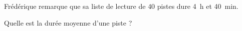 
\begin{mental}
    Frédérique remarque que sa liste de lecture de \( 40\) pistes dure \SI{4}{\hour} et \SI{40}{\minute}.

    Quelle est la durée moyenne d'une piste ?
\end{mental}
